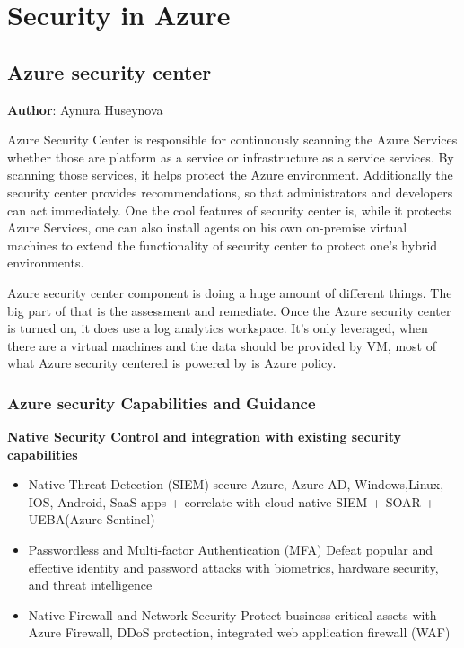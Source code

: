 \section{Security in Azure}

\subsection{Azure security center}

\textbf{Author}: Aynura Huseynova


Azure Security Center is responsible for continuously scanning the Azure Services whether those are platform as a service or infrastructure as a service services. By scanning those services, it helps protect the Azure environment. Additionally the security center provides recommendations, so that administrators and developers can act immediately.  One the cool features of security center is, while it protects Azure Services, one can also install agents on his own on-premise virtual machines to extend the functionality of security center to protect one’s hybrid environments.




Azure security center component is doing a huge amount of  different things. The big part of that is the assessment and remediate. Once the Azure security center is turned on, it does use a log analytics workspace. It’s only leveraged, when there are a virtual machines and the data should be provided by VM, most of what Azure security centered is powered by is Azure policy.



\subsubsection{Azure security Capabilities and Guidance}
\textbf{Native Security Control
and integration with existing security capabilities }
\begin{itemize}
    

\item  Native Threat Detection (SIEM)
secure Azure, Azure AD, Windows,Linux, IOS, Android, SaaS apps + correlate with cloud native SIEM + SOAR + UEBA(Azure Sentinel) 

\item Passwordless and Multi-factor Authentication (MFA)
Defeat popular and effective identity and password attacks with biometrics, hardware security, and threat intelligence 

\item Native Firewall and Network Security 
Protect business-critical assets with Azure Firewall, DDoS protection, integrated web application firewall (WAF) 

\end{itemize}


